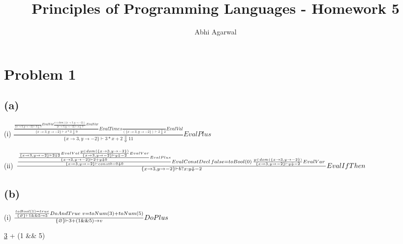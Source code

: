 \documentclass[11pt, oneside]{article}
\title{Principles of Programming Languages - Homework 5}
\author{Abhi Agarwal}
\date{}
\let\emptyset\varnothing
\newcommand{\forceindent}{\leavevmode{\parindent=1.5em\indent}}
\begin{document}
\maketitle
\section{Problem 1}
\subsection*{(a)}
\forceindent \par (i) 
$
\frac{
	\frac{
		\frac{
		}
		{
			\{x \rightarrow 3, y \rightarrow -2\} \vdash 3 \Downarrow 3
		} EvalVal
		\frac{
			x \in dom(\{x \rightarrow 3, y \rightarrow -2\})
		}
		{
			\{x \rightarrow 3, y \rightarrow -2\} \vdash x \Downarrow 3
		} EvalVar
	}
	{
		\{x \rightarrow 3, y \rightarrow -2\} \vdash x * 3 \Downarrow 9
	} EvalTimes
	\frac{
	}{
		(\{x \rightarrow 3, y \rightarrow -2\}) \vdash 2 \Downarrow 2
	} EvalVal
	{
	}
}{
	\{x \rightarrow 3, y \rightarrow -2\} \vdash 3 * x + 2 \Downarrow 11
} EvalPlus
$

\par (ii)
$
\frac{
	\frac{
		\frac {
			\frac {
			}
			{
				\{x \rightarrow 3, y \rightarrow -2\} \vdash 2 \Downarrow 2
			} EvalVal
			\frac {
				y \in dom(\{x \rightarrow 3, y \rightarrow -2\})
			}
			{
				\{x \rightarrow 3, y \rightarrow -2\} \vdash y \Downarrow -2
			} EvalVar
		}
		{
			\{x \rightarrow 3, y \rightarrow -2\} \vdash 2 + y \Downarrow 0
		} EvalPlus
	}
	{
		\{x \rightarrow 3, y \rightarrow -2\} \vdash const b = 0 \Downarrow 0
	} EvalConstDecl \thinspace
	false = toBool(0) \thinspace
	\frac{
		y \in dom(\{x \rightarrow 3, y \rightarrow -2\})
	}
	{
		\{x \rightarrow 3, y \rightarrow -2\} \vdash y \Downarrow -2
	} EvalVar \thinspace
}{
	\{x \rightarrow 3, y \rightarrow -2\} \vdash b ? x : y \Downarrow -2
} EvalIfThen
$

\subsection*{(b)}
\forceindent \par (i)
$
\frac{
	\frac{
		toBool(1) = true
	}
	{
		\{\emptyset\} \vdash 1 \&\& 5 \rightarrow 5
	} DoAndTrue \thinspace \thinspace
	v = toNum(3) + toNum(5)
}{
	\{\emptyset\} \vdash 3 + (1 \&\& 5) \rightarrow v
} DoPlus
$

\vspace{1.5\baselineskip}

\par \underline{3} + (1 \&\& 5) 
\end{document}
